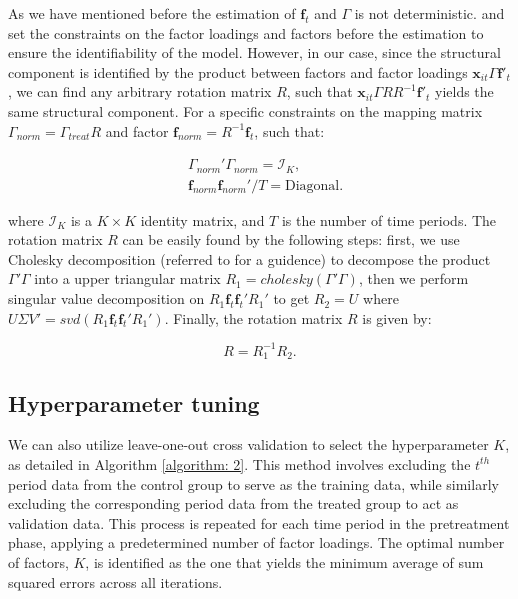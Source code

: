 \documentclass[12pt]{article}
\begin{document}
As we have mentioned before the estimation of $\bm{f}_{t}$ and $\Gamma$ is not deterministic. \cite{bai2009panel} and \cite{xu2017generalized} set the constraints on the factor loadings and factors before the estimation to ensure the identifiability of the model. However, in our case, since the structural component is identified by the product between factors and factor loadings $\bm{x}_{it}\Gamma \bm{f}'_{t}$, we can find any arbitrary rotation matrix $R$, such that $\bm{x}_{it}\Gamma R R^{-1}\bm{f}'_{t}$ yields the same structural component. For a specific constraints on the mapping matrix $\Gamma_{norm} = \Gamma_{treat}R$ and factor $\bm{f}_{norm} = R^{-1}\bm{f}_t$, such that:

\begin{equation}
\begin{aligned}
& \Gamma_{norm}'\Gamma_{norm} = \mathcal{I}_K, \\
& \bm{f}_{norm} \bm{f}_{norm}'/T = \text{Diagonal}.
\end{aligned}
\end{equation}

where $\mathcal{I}_K$ is a $K \times K$ identity matrix, and $T$ is the number of time periods. The rotation matrix $R$ can be easily found by the following steps: first, we use Cholesky decomposition (referred to \cite{higham2009cholesky} for a guidence) to decompose the product $\Gamma' \Gamma$ into a upper triangular matrix $R_1 = cholesky(\Gamma' \Gamma)$, then we perform singular value decomposition on $R_1\bm{f}_t\bm{f}_t'R_1'$ to get $R_2 = U$ where $U\Sigma V'=svd(R_1\bm{f}_t\bm{f}_t'R_1')$. Finally, the rotation matrix $R$ is given by:

\begin{equation}
R = R_1^{-1}R_2.
\end{equation}

\subsection{Hyperparameter tuning}
\label{sec: appendix hyperparameter}
We can also utilize leave-one-out cross validation to select the hyperparameter $K$, as detailed in Algorithm \ref{algorithm: 2}. This method involves excluding the $t^{th}$ period data from the control group to serve as the training data, while similarly excluding the corresponding period data from the treated group to act as validation data. This process is repeated for each time period in the pretreatment phase, applying a predetermined number of factor loadings. The optimal number of factors, $K$, is identified as the one that yields the minimum average of sum squared errors across all iterations.
\end{document}
